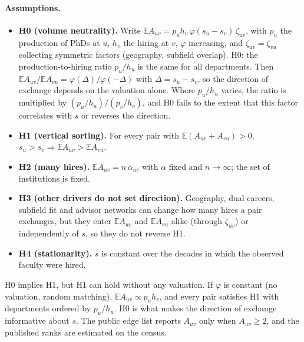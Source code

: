 \paragraph{Assumptions.}
\begin{itemize}
\item \textbf{H0 (volume neutrality).} Write $\mathbb E A_{uv}=p_uh_v\,\varphi(s_u-s_v)\,\zeta_{uv}$, with $p_u$
the production of PhDs at $u$, $h_v$ the hiring at $v$, $\varphi$ increasing, and $\zeta_{uv}=\zeta_{vu}$
collecting symmetric factors (geography, subfield overlap). H0: the production-to-hiring ratio $p_u/h_u$ is the
same for all departments. Then $\mathbb E A_{uv}/\mathbb E A_{vu}=\varphi(\Delta)/\varphi(-\Delta)$ with
$\Delta=s_u-s_v$, so the direction of exchange depends on the valuation alone. Where $p_u/h_u$ varies, the ratio
is multiplied by $(p_u/h_u)/(p_v/h_v)$, and H0 fails to the extent that this factor correlates with $s$ or reverses
the direction.
\item \textbf{H1 (vertical sorting).} For every pair with $\mathbb E(A_{uv}+A_{vu})>0$,
$s_u>s_v\Rightarrow\mathbb E A_{uv}>\mathbb E A_{vu}$.
\item \textbf{H2 (many hires).} $\mathbb E A_{uv}=n\,\alpha_{uv}$ with $\alpha$ fixed and $n\to\infty$; the set
of institutions is fixed.
\item \textbf{H3 (other drivers do not set direction).} Geography, dual careers, subfield fit and advisor networks
can change how many hires a pair exchanges, but they enter $\mathbb E A_{uv}$ and $\mathbb E A_{vu}$ alike
(through $\zeta_{uv}$) or independently of $s$, so they do not reverse H1.
\item \textbf{H4 (stationarity).} $s$ is constant over the decades in which the observed faculty were hired.
\end{itemize}
H0 implies H1, but H1 can hold without any valuation. If $\varphi$ is constant
(no valuation, random matching), $\mathbb E A_{uv}\propto p_uh_v$, and every pair satisfies H1 with departments
ordered by $p_u/h_u$. H0 is what makes the direction of exchange informative about $s$. The public edge list
reports $A_{uv}$ only when $A_{uv}\ge2$, and the published ranks are estimated on the census.

